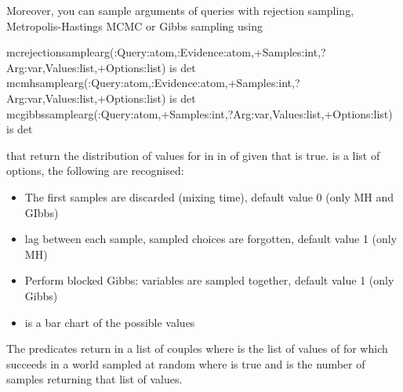 \documentclass[letterpaper,10pt,english]{sphinxmanual}
\begin{document}
Moreover, you can sample arguments of queries with rejection sampling, Metropolis-Hastings MCMC or Gibbs sampling using

\begin{sphinxVerbatim}[commandchars=\\\{\}]
mc\PYGZus{}rejection\PYGZus{}sample\PYGZus{}arg(:Query:atom,:Evidence:atom,+Samples:int,?Arg:var,\PYGZhy{}Values:list,+Options:list) is det
mc\PYGZus{}mh\PYGZus{}sample\PYGZus{}arg(:Query:atom,:Evidence:atom,+Samples:int,?Arg:var,\PYGZhy{}Values:list,+Options:list) is det
mc\PYGZus{}gibbs\PYGZus{}sample\PYGZus{}arg(:Query:atom,+Samples:int,?Arg:var,\PYGZhy{}Values:list,+Options:list) is det
\end{sphinxVerbatim}

that return the distribution of values for  in  in  of  given that  is true.  is a list of options, the following are recognised:
\begin{itemize}
\item {} 
 The first  samples are discarded (mixing time), default value 0 (only MH and GIbbs)

\item {} 
 lag between each sample,  sampled choices are forgotten, default value 1 (only MH)

\item {} 
 Perform blocked Gibbs:  variables are sampled together, default value 1 (only Gibbs)

\item {} 
  is a bar chart of the possible values

\end{itemize}

The predicates return in  a list of couples  where  is the list of values of  for which  succeeds in a world sampled at random where  is true and  is the number of samples returning that list of values.
\end{document}
